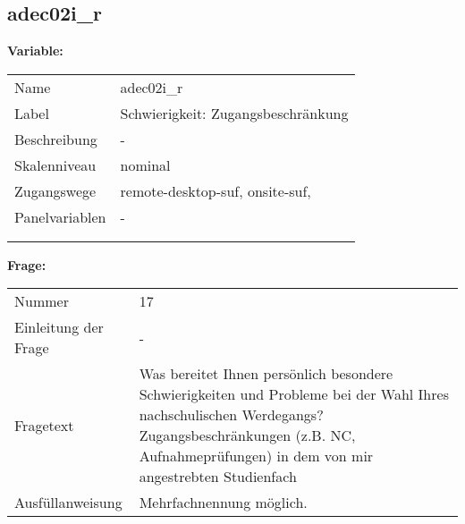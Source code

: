 	
	
	\subsection{adec02i\_r}
	\label{subSection:adec02i_r}

	\noindent\textbf{Variable:}\\
		\begin{tabular}{lL{11.3cm}}
			\label{tableVariable:adec02i_r}
			Name & adec02i\_r \\
			Label & Schwierigkeit: Zugangsbeschränkung \\
			Beschreibung & - \\
			Skalenniveau & nominal \\
			Zugangswege &
				remote-desktop-suf,
				onsite-suf,
 \\
			Panelvariablen & -
			 \\
			 \\
 \\
		\end{tabular}

		\vspace*{1 cm}
		\noindent\textbf{Frage:}\\
		\begin{tabular}{lL{11.3cm}}
			\label{tableQuestion:adec02i_r}
			Nummer & 17 \\
			Einleitung der Frage & - \\
			Fragetext & Was bereitet Ihnen persönlich besondere Schwierigkeiten und Probleme bei der Wahl Ihres nachschulischen Werdegangs?
Zugangsbeschränkungen (z.B. NC, Aufnahmeprüfungen) in dem von mir angestrebten Studienfach \\
			Ausfüllanweisung & Mehrfachnennung möglich. \\
		\end{tabular}





